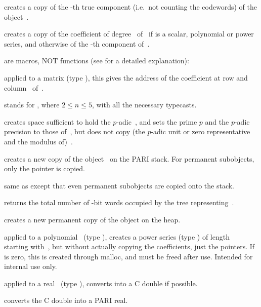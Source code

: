  creates a copy of the -th true
component (i.e.\ not counting the codewords) of the object~.

 creates a copy of the coefficient of
degree~ of~ if  is a scalar, polynomial or power series,
and otherwise of the -th component of~.

\noindent %
are macros, NOT functions (see  for a detailed
explanation):

 applied to a matrix  (type
), this gives the address of the coefficient at row  and
column~ of~.

 stands for
, where $2\le n \le 5$, with all the necessary
typecasts.


 creates space sufficient to hold the
$p$-adic~, and sets the prime $p$ and the $p$-adic precision to those
of~, but does not copy (the $p$-adic unit or zero representative and
the modulus of)~.

 creates a new copy of the object~ on the PARI
stack. For permanent subobjects, only the pointer is copied.

 same as  except that even permanent
subobjects are copied onto the stack.

 returns the total number of \B-bit words occupied
by the tree representing~.

 creates a new permanent copy of the object 
on the heap.

 applied to a
polynomial~ (type ), creates a power series (type )
of length~ starting with~, but without actually copying the
coefficients, just the pointers. If  is zero, this is created
through malloc, and must be freed after use. Intended for internal use only.

 applied to a real~ (type ),
converts  into a C double if possible.

 converts the C double  into a PARI real.

